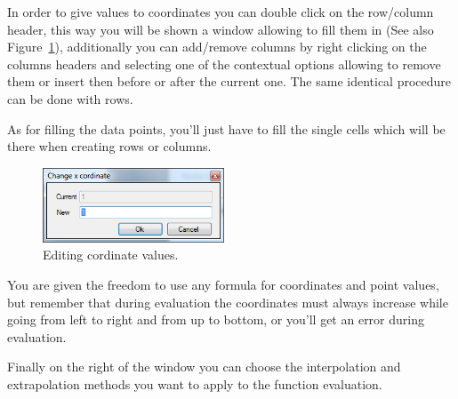 In order to give values to coordinates you can double click on the row/column header, this way you will be shown 
a window allowing to fill them in (See also Figure~\ref{fig.PFunction2DColumnEdit}), additionally you can add/remove columns by right clicking on the columns headers and selecting one of the contextual options allowing to remove them or insert then before or after the current one. The same identical procedure can be done with rows.

As for filling the data points, you'll just have to fill the single cells which will be there when creating rows or columns.

\begin{figure}[h]
\begin{center}
\includegraphics[width=0.48\textwidth]{./images/PFunction2DColumnEdit.png}
\caption{Editing cordinate values.}
\label{fig.PFunction2DColumnEdit}
\end{center}
\end{figure}

You are given the freedom to use any formula for coordinates and point values, but remember that during evaluation the coordinates must always increase while going from left to right and from up to bottom, or you'll get an error during evaluation.

Finally on the right of the window you can choose the interpolation and extrapolation methods you want to apply to the function evaluation.


